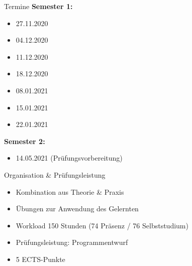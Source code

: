     \begin{frame}{Termine}
        \textbf{Semester 1:}
        \begin{itemize}
            \item 27.11.2020
            \item 04.12.2020
            \item 11.12.2020
            \item 18.12.2020
            \item 08.01.2021
            \item 15.01.2021
            \item 22.01.2021
        \end{itemize}
        
        \textbf{Semester 2:}
        \begin{itemize}
            \item 14.05.2021 (Prüfungsvorbereitung)
        \end{itemize}
    \end{frame}
    
    \begin{frame}{Organisation \& Prüfungsleistung}
    
        \begin{itemize}
            \item Kombination aus Theorie \& Praxis
            \item Übungen zur Anwendung des Gelernten
            \item Workload 150 Stunden (74 Präsenz / 76 Selbststudium) \newline
            \item Prüfungsleistung: Programmentwurf
            \item 5 ECTS-Punkte
        \end{itemize}
     \end{frame}
    
